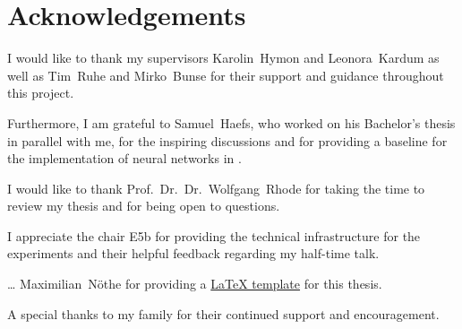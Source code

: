 \chapter*{Acknowledgements}

I would like to thank
my supervisors
  Karolin~Hymon and
  Leonora~Kardum
as well as
  Tim~Ruhe and
  Mirko~Bunse
for their support and guidance throughout this project.

Furthermore,
I am grateful to Samuel~Haefs,
  who worked on his Bachelor's thesis in parallel with me,
for the inspiring discussions
and for providing a baseline for the implementation of neural networks in \dsea.

I would like to thank Prof.~Dr.~Dr.~Wolfgang~Rhode for taking the time to
review my thesis
and for being open to questions.

I appreciate the chair E5b for providing the technical infrastructure for the experiments
and their helpful feedback regarding my half-time talk.

… Maximilian~Nöthe for providing a \href{https://github.com/maxnoe/tudothesis}{\LaTeX{} template} for this thesis.


A special thanks to my family for their continued support and encouragement.
